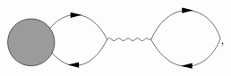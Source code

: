 \begin{equation}
\begin{gathered}
\begin{tikzpicture}[x=0.75pt,y=0.75pt,yscale=-1,xscale=1]
            \draw  [fill={rgb, 255:red, 155; green, 155; blue, 155 }  ,fill opacity=1 ] (56,136) .. controls (56,122.19) and (67.19,111) .. (81,111) .. controls (94.81,111) and (106,122.19) .. (106,136) .. controls (106,149.81) and (94.81,161) .. (81,161) .. controls (67.19,161) and (56,149.81) .. (56,136) -- cycle ;
            \draw    (101,121) .. controls (123,96) and (149,106) .. (162,133) ;
            \draw    (103,147) .. controls (125,172) and (149,160) .. (162,133) ;
            \draw    (135,107) ;
            \draw [shift={(135,107)}, rotate = 180] [fill={rgb, 255:red, 0; green, 0; blue, 0 }  ][line width=0.08]  [draw opacity=0] (12,-3) -- (0,0) -- (12,3) -- cycle    ;
            \draw    (129,160) -- (122,160) ;
            \draw [shift={(120,160)}, rotate = 360] [fill={rgb, 255:red, 0; green, 0; blue, 0 }  ][line width=0.08]  [draw opacity=0] (12,-3) -- (0,0) -- (12,3) -- cycle    ;
            \draw    (209,133) .. controls (230,87) and (272,97) .. (283,132) ;
            \draw    (209,133) .. controls (233,177) and (271,165) .. (283,132) ;
            \draw    (254,102) ;
            \draw [shift={(254,102)}, rotate = 180] [fill={rgb, 255:red, 0; green, 0; blue, 0 }  ][line width=0.08]  [draw opacity=0] (12,-3) -- (0,0) -- (12,3) -- cycle    ;
            \draw    (250,161) -- (243,161) ;
            \draw [shift={(241,161)}, rotate = 360] [fill={rgb, 255:red, 0; green, 0; blue, 0 }  ][line width=0.08]  [draw opacity=0] (12,-3) -- (0,0) -- (12,3) -- cycle    ;
            \draw    (162,133) .. controls (163.67,131.33) and (165.33,131.33) .. (167,133) .. controls (168.67,134.67) and (170.33,134.67) .. (172,133) .. controls (173.67,131.33) and (175.33,131.33) .. (177,133) .. controls (178.67,134.67) and (180.33,134.67) .. (182,133) .. controls (183.67,131.33) and (185.33,131.33) .. (187,133) .. controls (188.67,134.67) and (190.33,134.67) .. (192,133) .. controls (193.67,131.33) and (195.33,131.33) .. (197,133) .. controls (198.67,134.67) and (200.33,134.67) .. (202,133) .. controls (203.67,131.33) and (205.33,131.33) .. (207,133) -- (209,133) -- (209,133) ;
            \end{tikzpicture}            
    \end{gathered},
\end{equation}